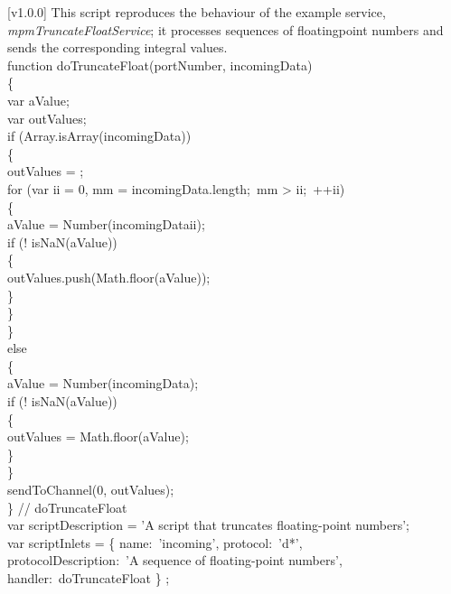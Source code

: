[v1.0.0]
%
This script reproduces the behaviour of the example service,
\emph{mpmTruncateFloatService}; it processes sequences of floating\longDash{}point numbers
and sends the corresponding integral values.\\

\codeBegin{}
function doTruncateFloat(portNumber, incomingData)\\
\{\\
\tS{}var aValue;\\
\tS{}var outValues;\\
    
\tS{}if (Array.isArray(incomingData))\\
\tS\{\\
\tS\tS{}outValues = \openSq\closeSq;\\
\tS\tS{}for (var ii = 0, mm = incomingData.length;\ mm > ii;\ ++ii)\\
\tS\tS\{\\
\tS\tS\tS{}aValue = Number(incomingData\openSq{}ii\closeSq);\\
\tS\tS\tS{}if (! isNaN(aValue))\\
\tS\tS\tS\{\\
\tS\tS\tS\tS{}outValues.push(Math.floor(aValue));\\
\tS\tS\tS\}\\
\tS\tS\}\\
\tS\}\\
\tS{}else\\
\tS\{\\
\tS\tS{}aValue = Number(incomingData);\\
\tS\tS{}if (! isNaN(aValue))\\
\tS\tS\{\\
\tS\tS\tS{}outValues = Math.floor(aValue);\\
\tS\tS\}\\
\tS\}\\
\tS{}sendToChannel(0, outValues);\\
\} // doTruncateFloat\\

var scriptDescription = 'A script that truncates floating-point numbers';\\

var scriptInlets = \openSq{} \{ name:\ 'incoming', protocol:\ 'd*',\\
\tS\tS\tS\tS\tS\tS\tS\tS\tS\tS{}protocolDescription:\
'A sequence of floating-point numbers',\\
\tS\tS\tS\tS\tS\tS\tS\tS\tS\tS{}handler:\ doTruncateFloat \} \closeSq;\\

